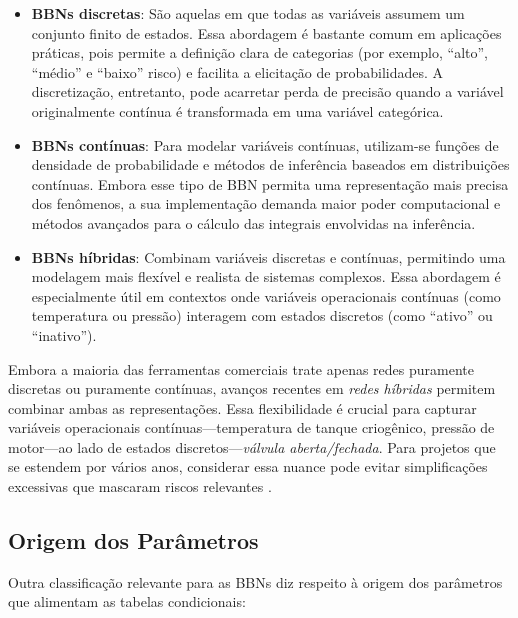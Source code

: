 \begin{itemize}
  \label{subsec:variaveis}
  \item \textbf{BBNs discretas}: São aquelas em que todas as variáveis assumem um conjunto finito de estados. Essa abordagem é bastante comum em aplicações práticas, pois permite a definição clara de categorias (por exemplo, “alto”, “médio” e “baixo” risco) e facilita a elicitação de probabilidades. A discretização, entretanto, pode acarretar perda de precisão quando a variável originalmente contínua é transformada em uma variável categórica.

  \item \textbf{BBNs contínuas}:  Para modelar variáveis contínuas, utilizam-se funções de densidade de probabilidade e métodos de inferência baseados em distribuições contínuas. Embora esse tipo de BBN permita uma representação mais precisa dos fenômenos, a sua implementação demanda maior poder computacional e métodos avançados para o cálculo das integrais envolvidas na inferência.

  \item \textbf{BBNs híbridas}: Combinam variáveis discretas e contínuas, permitindo uma modelagem mais flexível e realista de sistemas complexos. Essa abordagem é especialmente útil em contextos onde variáveis operacionais contínuas (como temperatura ou pressão) interagem com estados discretos (como “ativo” ou “inativo”).

\end{itemize}

Embora a maioria das ferramentas comerciais trate apenas redes puramente discretas ou puramente contínuas, avanços recentes em \emph{redes híbridas} permitem combinar ambas as representações. Essa flexibilidade é crucial para capturar variáveis operacionais contínuas—temperatura de tanque criogênico, pressão de motor—ao lado de estados discretos—\emph{válvula aberta/fechada}. Para projetos que se estendem por vários anos, considerar essa nuance pode evitar simplificações excessivas que mascaram riscos relevantes \cite{lerner2021hybrid}.





\subsection{Origem dos Parâmetros}
Outra classificação relevante para as BBNs diz respeito à origem dos parâmetros que alimentam as tabelas condicionais:


